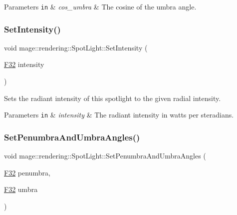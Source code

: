 \begin{DoxyParams}[1]{Parameters}
\mbox{\tt in}  & {\em cos\+\_\+umbra} & The cosine of the umbra angle. \\
\hline
\end{DoxyParams}
\hypertarget{classmage_1_1rendering_1_1_spot_light_aa59f043d14fb1e66377c9462c350717f}{}\label{classmage_1_1rendering_1_1_spot_light_aa59f043d14fb1e66377c9462c350717f} 
\subsubsection{\texorpdfstring{Set\+Intensity()}{SetIntensity()}}
{\footnotesize\ttfamily void mage\+::rendering\+::\+Spot\+Light\+::\+Set\+Intensity (\begin{DoxyParamCaption}\item[{\hyperlink{namespacemage_aa97e833b45f06d60a0a9c4fc22ae02c0}{F32}}]{intensity }\end{DoxyParamCaption})\hspace{0.3cm}{\ttfamily [noexcept]}}

Sets the radiant intensity of this spotlight to the given radial intensity.


\begin{DoxyParams}[1]{Parameters}
\mbox{\tt in}  & {\em intensity} & The radiant intensity in watts per steradians. \\
\hline
\end{DoxyParams}
\hypertarget{classmage_1_1rendering_1_1_spot_light_aa2e2c75dabaf5d33141d9b8a1163f317}{}\label{classmage_1_1rendering_1_1_spot_light_aa2e2c75dabaf5d33141d9b8a1163f317} 
\subsubsection{\texorpdfstring{Set\+Penumbra\+And\+Umbra\+Angles()}{SetPenumbraAndUmbraAngles()}}
{\footnotesize\ttfamily void mage\+::rendering\+::\+Spot\+Light\+::\+Set\+Penumbra\+And\+Umbra\+Angles (\begin{DoxyParamCaption}\item[{\hyperlink{namespacemage_aa97e833b45f06d60a0a9c4fc22ae02c0}{F32}}]{penumbra,  }\item[{\hyperlink{namespacemage_aa97e833b45f06d60a0a9c4fc22ae02c0}{F32}}]{umbra }\end{DoxyParamCaption})\hspace{0.3cm}{\ttfamily [noexcept]}}

